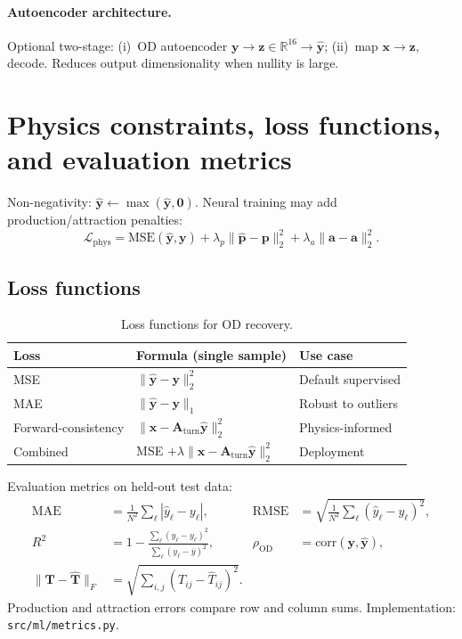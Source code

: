 \documentclass[11pt,a4paper]{report}
\newcommand{\mathbfp}{\mathbf{p}}
\newcommand{\mathbfa}{\mathbf{a}}
\newcommand{\mathbfy}{\mathbf{y}}
\newcommand{\mathbfx}{\mathbf{x}}
\newcommand{\Aturn}{\mathbf{A}_{\mathrm{turn}}}
\newcommand{\mathbfz}{\mathbf{z}}
\begin{document}
\paragraph{Autoencoder architecture.}
Optional two-stage: (i)~OD autoencoder $\mathbfy\to\mathbfz\in\mathbb{R}^{16}\to\hat{\mathbfy}$; (ii)~map $\mathbfx\to\mathbfz$, decode. Reduces output dimensionality when nullity is large.


\section{Physics constraints, loss functions, and evaluation metrics}
\label{sec:ch3-physics}

Non-negativity: $\hat{\mathbfy}\leftarrow\max(\hat{\mathbfy},\mathbf{0})$. Neural training may add production/attraction penalties:
\begin{equation}
    \mathcal{L}_{\mathrm{phys}} = \mathrm{MSE}(\hat{\mathbfy},\mathbfy)
    + \lambda_p \|\hat{\mathbfp}-\mathbfp\|_2^2
    + \lambda_a \|\hat{\mathbfa}-\mathbfa\|_2^2.
\end{equation}

\subsection{Loss functions}

\begin{table}[ht]
\centering
\caption{Loss functions for OD recovery.}
\label{tab:loss}
\begin{tabular}{@{}lll@{}}
\toprule
\textbf{Loss} & \textbf{Formula (single sample)} & \textbf{Use case} \\
\midrule
MSE & $\|\hat{\mathbfy}-\mathbfy\|_2^2$ & Default supervised \\
MAE & $\|\hat{\mathbfy}-\mathbfy\|_1$ & Robust to outliers \\
Forward-consistency & $\|\mathbfx-\Aturn\hat{\mathbfy}\|_2^2$ & Physics-informed \\
Combined & MSE $+\lambda\|\mathbfx-\Aturn\hat{\mathbfy}\|_2^2$ & Deployment \\
\bottomrule
\end{tabular}
\end{table}

Evaluation metrics on held-out test data:
\begin{align}
    \mathrm{MAE} &= \frac{1}{N^2}\sum_{\ell}|\hat{y}_\ell - y_\ell|, &
    \mathrm{RMSE} &= \sqrt{\frac{1}{N^2}\sum_{\ell}(\hat{y}_\ell-y_\ell)^2}, \\
    R^2 &= 1 - \frac{\sum_\ell(\hat{y}_\ell-y_\ell)^2}{\sum_\ell(y_\ell-\bar{y})^2}, &
    \rho_{\mathrm{OD}} &= \mathrm{corr}(\mathbfy,\hat{\mathbfy}), \\
    \|\mathbf{T}-\hat{\mathbf{T}}\|_F &= \sqrt{\sum_{i,j}(T_{ij}-\hat{T}_{ij})^2}. &
\end{align}
Production and attraction errors compare row and column sums. Implementation: \texttt{src/ml/metrics.py}.
\end{document}

